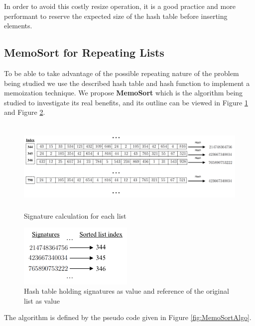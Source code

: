 \documentclass[a4paper,12pt]{article}
\begin{document}
In order to avoid this costly resize operation, it is a good practice and more performant to reserve the expected size of the hash table before inserting elements. 

\subsection{MemoSort for Repeating Lists}
To be able to take advantage of the possible repeating nature of the problem being studied we use the described hash table and hash function to implement a memoization technique. We propose \textbf{MemoSort} which is the algorithm being studied to investigate its real benefits, and its outline can be viewed in Figure \ref{fig:MemoSortDiagram} and Figure \ref{fig:MemoSortDiagramHash}.

\begin{figure}[H]
    \centering
     \includegraphics[height=4.5cm,keepaspectratio]{./images/MemoSortDiagram.png}
    \caption{Signature calculation for each list}
    \label{fig:MemoSortDiagram}
\end{figure}

\begin{figure}[H]
    \centering
     \includegraphics[height=3cm,keepaspectratio]{./images/hashTableDiagram.png}
    \caption{Hash table holding signatures as value and reference of the original list as value}
    \label{fig:MemoSortDiagramHash}
\end{figure}

The algorithm is defined by the pseudo code given in Figure \ref{fig:MemoSortAlgo}.
\end{document}
